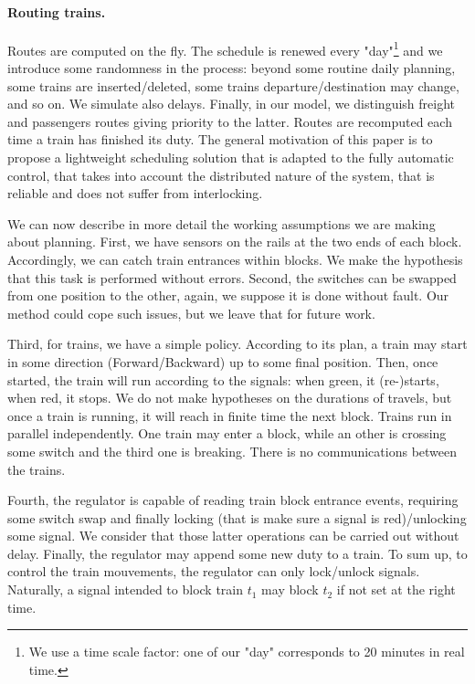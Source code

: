 \documentclass[runningheads]{llncs}
\begin{document}
\paragraph{Routing trains.}
Routes are computed on the fly. The schedule is renewed every "day"\footnote{We use a time scale factor: one of our "day" corresponds to 20 minutes in real time.}  and we introduce some randomness in the process: beyond some routine daily planning, some trains are inserted/deleted, some trains departure/destination may change, and so on. We simulate also delays. Finally, in our model, we distinguish freight and  passengers routes giving priority to the latter. Routes are recomputed each time a train has finished its duty. The general motivation of this paper is to propose a lightweight scheduling solution that is adapted to the fully automatic control, that takes into account the distributed nature of the system, that is reliable and does not suffer from interlocking.  
 
We can now describe in more detail the working assumptions we are making about planning.  First, we have sensors on the rails at the two ends of each block. Accordingly,  we can catch train entrances within blocks. We make the hypothesis that this task is performed without errors. Second, the switches can be swapped from one position to the other, again, we suppose it is done without fault. Our method could cope such issues, but we leave that for future work. 
 
  Third, for trains, we have a simple policy.  According to its plan, a train may start in some direction (Forward/Backward) up to some final position. Then, once started, the train will run according to the signals: when green, it (re-)starts, when red, it stops.  We do not make hypotheses on the durations of travels, but once a train is running, it will reach in finite time the next block. Trains run in parallel independently. One train may enter a block, while an other is crossing some switch and the third one is breaking. There is no communications between the trains.

Fourth,  the regulator is capable of reading train block entrance events, requiring some switch swap and finally locking (that is make sure a signal is red)/unlocking some signal. We consider that those latter operations can be carried out without delay. Finally, the regulator may append some new duty to a train. To sum up, to control the train mouvements, the regulator can only lock/unlock signals. Naturally, a signal intended to block train $t_1$ may block $t_2$ if not set at the right time.   
 
\end{document}
